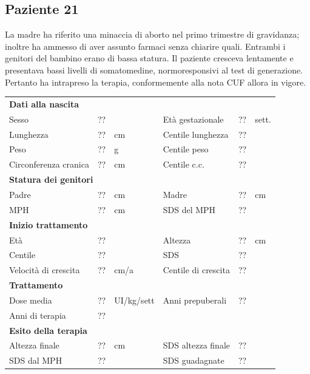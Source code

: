 \subsection*{Paziente 21}%

La madre ha riferito una minaccia di aborto nel primo trimestre di gravidanza; inoltre ha ammesso di aver assunto farmaci senza chiarire quali. Entrambi i genitori del bambino erano di bassa statura. Il paziente cresceva lentamente e presentava bassi livelli di somatomedine, normoresponsivi al test di generazione. Pertanto ha intrapreso la terapia, conformemente alla nota CUF allora in vigore.

\begin{table}[!h]
\begin{tabular}{lrllrl}
\toprule
\multicolumn{6}{l}{\textbf{Dati alla nascita}}\\
Sesso 		& \multicolumn{2}{l}{??} 	& Età gestazionale 		& ?? 		& sett.\\
Lunghezza 	& ?? 		& cm 				& Centile lunghezza		& ?? 		\\
Peso 		& ?? 		& g					& Centile peso			& ?? 		\\
Circonferenza cranica	& ?? 		& cm 	& Centile c.c.			& ?? \\
\midrule
\multicolumn{6}{l}{\textbf{Statura dei genitori}}\\
Padre 		& ?? & cm 	& Madre 				& ?? & cm \\
MPH 		& ?? & cm 	& SDS del MPH 			& ??\\
\midrule
\multicolumn{6}{l}{\textbf{Inizio trattamento}} \\
Età	& ?? & 		& Altezza 				& ?? & cm  \\
Centile & ?? 	 &		& SDS		& ?? \\
Velocità di crescita & ?? & cm/a	& Centile di crescita & ??\\
\midrule
\multicolumn{6}{l}{\textbf{Trattamento}} \\
Dose media		& ?? & UI/kg/sett & Anni prepuberali & ??\\
Anni di terapia & ??\\
\midrule
\multicolumn{6}{l}{\textbf{Esito della terapia}} \\
Altezza finale			& ?? & cm 	& SDS altezza finale		& ??\\
SDS dal MPH				& ?? &		& SDS guadagnate 			& ??\\
\bottomrule
\end{tabular}
\end{table}
\clearpage


